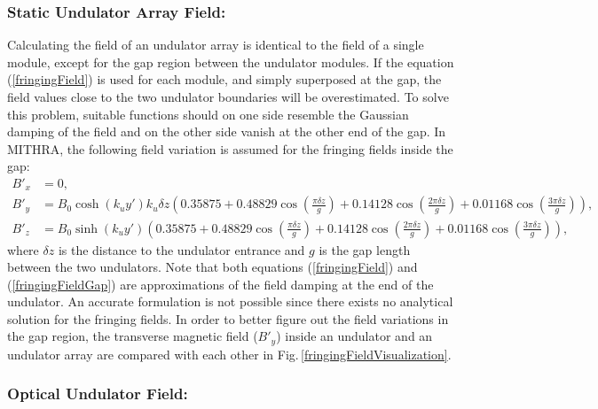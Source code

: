\subsubsection{Static Undulator Array Field:}

Calculating the field of an undulator array is identical to the field of a single module, except for the gap region between the undulator modules.
%
If the equation (\ref{fringingField}) is used for each module, and simply superposed at the gap, the field values close to the two undulator boundaries will be overestimated.
%
To solve this problem, suitable functions should on one side resemble the Gaussian damping of the field and on the other side vanish at the other end of the gap.
%
In MITHRA, the following field variation is assumed for the fringing fields inside the gap:
%
\begin{align}
B'_x & = 0, \nonumber \\
B'_y & = B_0 \cosh(k_uy')k_u\delta z \left( 0.35875 + 0.48829 \cos( \frac{\pi \delta z}{g} ) + 0.14128 \cos( \frac{2 \pi \delta z}{g} ) + 0.01168 \cos( \frac{3 \pi \delta z}{g} ) \right), \label{fringingFieldGap} \\
B'_z & = B_0 \sinh(k_uy') \left( 0.35875 + 0.48829 \cos( \frac{\pi \delta z}{g} ) + 0.14128 \cos( \frac{2 \pi \delta z}{g} ) + 0.01168 \cos( \frac{3 \pi \delta z}{g} ) \right), \nonumber
\end{align}
%
where $\delta z$ is the distance to the undulator entrance and $g$ is the gap length between the two undulators.
%
Note that both equations (\ref{fringingField}) and (\ref{fringingFieldGap}) are approximations of the field damping at the end of the undulator.
%
An accurate formulation is not possible since there exists no analytical solution for the fringing fields.
%
In order to better figure out the field variations in the gap region, the transverse magnetic field ($B'_y$) inside an undulator and an undulator array are compared with each other in Fig.\,\ref{fringingFieldVisualization}.

\subsubsection{Optical Undulator Field:}

